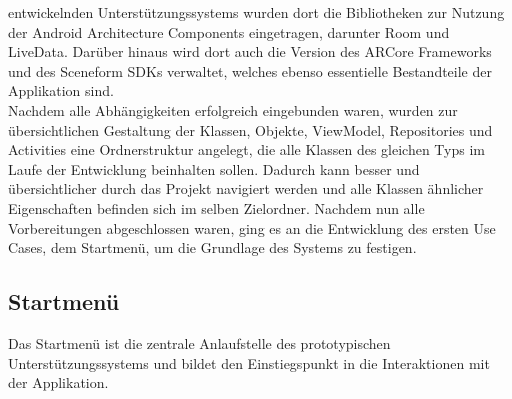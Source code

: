 entwickelnden Unterstützungssystems wurden dort die Bibliotheken zur Nutzung der Android Architecture Components eingetragen, darunter Room und LiveData. 
Darüber hinaus wird dort auch die Version des ARCore Frameworks und des Sceneform \acs{SDK}s verwaltet, welches ebenso essentielle Bestandteile der 
Applikation sind.
\\ 
Nachdem alle Abhängigkeiten erfolgreich eingebunden waren, wurden zur übersichtlichen Gestaltung der Klassen, Objekte, ViewModel, Repositories und Activities 
eine Ordnerstruktur angelegt, die alle Klassen des gleichen Typs im Laufe der Entwicklung beinhalten sollen. Dadurch kann besser und übersichtlicher durch 
das Projekt navigiert werden und alle Klassen ähnlicher Eigenschaften befinden sich im selben Zielordner. Nachdem nun alle Vorbereitungen abgeschlossen 
waren, ging es an die Entwicklung des ersten Use Cases, dem Startmenü, um die Grundlage des Systems zu festigen.  

\subsection{Startmenü}
Das Startmenü ist die zentrale Anlaufstelle des prototypischen Unterstützungssystems und bildet den Einstiegspunkt in die Interaktionen mit der Applikation. 

